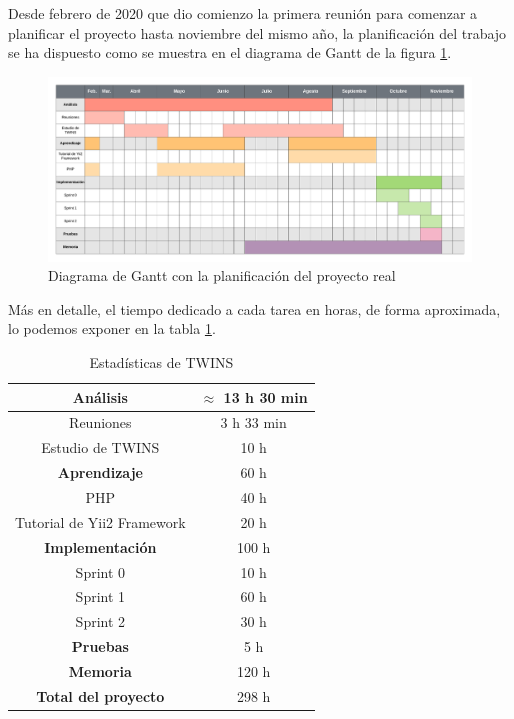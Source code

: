 Desde febrero de 2020 que dio comienzo la primera reunión para comenzar a planificar el proyecto hasta noviembre del mismo año, la planificación del trabajo se ha dispuesto como se muestra en el diagrama de Gantt de la figura \ref{fig:gantt}.

\begin{figure}
	\centering
	\includegraphics[width=\textwidth]{img/gantt.png}
	\caption[Diagrama de Gantt]{Diagrama de Gantt con la planificación del proyecto real}
	\label{fig:gantt}
\end{figure}

Más en detalle, el tiempo dedicado a cada tarea en horas, de forma aproximada, lo podemos exponer en la tabla \ref{tab:horas}.

\begin{table}[h]
	\begin{center}
		\begin{tabular}{ | c | c | } 
			\hline
			\textbf{Análisis} & $\approx$ 13 h 30 min \\
			\hline
			Reuniones & 3 h 33 min \\ 
			\hline
			Estudio de TWINS & 10 h \\
			\hline
			\textbf{Aprendizaje}  & 60 h \\ 
			\hline
			PHP & 40 h \\ 
			\hline
			Tutorial de Yii2 Framework & 20 h \\
			\hline
			\textbf{Implementación} & 100 h \\
			\hline
			Sprint 0 \footnotemark & 10 h \\
			\hline
			Sprint 1 & 60 h \\
			\hline
			Sprint 2 & 30 h \\
			\hline
			\textbf{Pruebas} & 5 h\\
			\hline
			\textbf{Memoria} & 120 h \\
			\hline
			\textbf{Total del proyecto} & 298 h \\
			\hline
		\end{tabular}
		\caption{Estadísticas de TWINS}
		\label{tab:horas}
	\end{center}
\end{table}~

